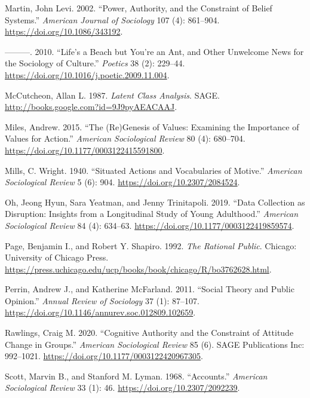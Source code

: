 \documentclass[12pt,]{article}
\begin{document}
\leavevmode\hypertarget{ref-martin2002}{}%
Martin, John Levi. 2002. ``Power, Authority, and the Constraint of Belief Systems.'' \emph{American Journal of Sociology} 107 (4): 861--904. \url{https://doi.org/10.1086/343192}.

\leavevmode\hypertarget{ref-martin2010}{}%
---------. 2010. ``Life's a Beach but You're an Ant, and Other Unwelcome News for the Sociology of Culture.'' \emph{Poetics} 38 (2): 229--44. \url{https://doi.org/10.1016/j.poetic.2009.11.004}.

\leavevmode\hypertarget{ref-mccutcheon1987}{}%
McCutcheon, Allan L. 1987. \emph{Latent Class Analysis}. SAGE. \url{http://books.google.com?id=9J9pyAEACAAJ}.

\leavevmode\hypertarget{ref-miles2015}{}%
Miles, Andrew. 2015. ``The (Re)Genesis of Values: Examining the Importance of Values for Action.'' \emph{American Sociological Review} 80 (4): 680--704. \url{https://doi.org/10.1177/0003122415591800}.

\leavevmode\hypertarget{ref-mills1940}{}%
Mills, C. Wright. 1940. ``Situated Actions and Vocabularies of Motive.'' \emph{American Sociological Review} 5 (6): 904. \url{https://doi.org/10.2307/2084524}.

\leavevmode\hypertarget{ref-oh2019}{}%
Oh, Jeong Hyun, Sara Yeatman, and Jenny Trinitapoli. 2019. ``Data Collection as Disruption: Insights from a Longitudinal Study of Young Adulthood.'' \emph{American Sociological Review} 84 (4): 634--63. \url{https://doi.org/10.1177/0003122419859574}.

\leavevmode\hypertarget{ref-page1992}{}%
Page, Benjamin I., and Robert Y. Shapiro. 1992. \emph{The Rational Public}. Chicago: University of Chicago Press. \url{https://press.uchicago.edu/ucp/books/book/chicago/R/bo3762628.html}.

\leavevmode\hypertarget{ref-perrin2011}{}%
Perrin, Andrew J., and Katherine McFarland. 2011. ``Social Theory and Public Opinion.'' \emph{Annual Review of Sociology} 37 (1): 87--107. \url{https://doi.org/10.1146/annurev.soc.012809.102659}.

\leavevmode\hypertarget{ref-rawlings2020}{}%
Rawlings, Craig M. 2020. ``Cognitive Authority and the Constraint of Attitude Change in Groups.'' \emph{American Sociological Review} 85 (6). SAGE Publications Inc: 992--1021. \url{https://doi.org/10.1177/0003122420967305}.

\leavevmode\hypertarget{ref-scott1968}{}%
Scott, Marvin B., and Stanford M. Lyman. 1968. ``Accounts.'' \emph{American Sociological Review} 33 (1): 46. \url{https://doi.org/10.2307/2092239}.
\end{document}
